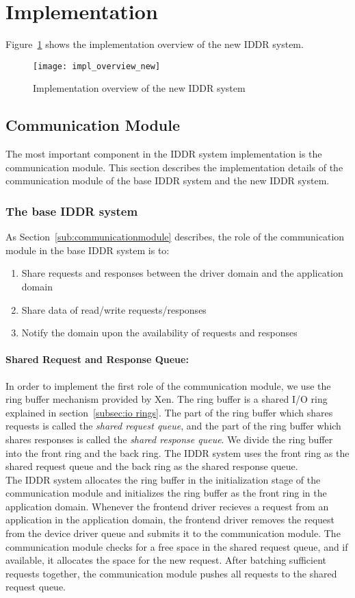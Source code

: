 \section{Implementation}

Figure~\ref{fig:Implementation overview} shows the implementation overview of the new IDDR system.

\begin{figure}[!ht]
\centering
\texttt{[image: impl\_overview\_new]}
\caption{Implementation overview of the new IDDR system}
\label{fig:Implementation overview}
\end{figure}

\subsection{Communication Module}
The most important component in the IDDR system implementation is the communication module. This section describes the implementation details of the communication module of the base IDDR system and the new IDDR system. 
\subsubsection*{The base IDDR system}
As Section~\ref{sub:communicationmodule} describes, the role of the communication module in the base IDDR system is to:
\begin{enumerate} 
\item Share requests and responses between the driver domain and the application domain
\item Share data of read/write requests/responses
\item Notify the domain upon the availability of requests and responses 
\end{enumerate}
\paragraph{Shared Request and Response Queue:}
In order to implement the first role of the communication module, we use the ring buffer mechanism provided by Xen. The ring buffer is a shared I/O ring explained in section~\ref{subsec:io rings}. The part of the ring buffer which shares requests is called the \textit{shared request queue}, and the part of the ring buffer which shares responses is called the \textit{shared response queue}. We divide the ring buffer into the front ring and the back ring. The IDDR system uses the front ring as the shared request queue and the back ring as the shared response queue. 
\\[3mm]
The IDDR system allocates the ring buffer in the initialization stage of the communication module and initializes the ring buffer as the front ring in the application domain. Whenever the frontend driver recieves a request from an application in the application domain, the frontend driver removes the request from the device driver queue and submits it to the communication module. The communication module checks for a free space in the shared request queue, and if available, it allocates the space for the new request. After batching sufficient requests together, the communication module pushes all requests to the shared request queue.

